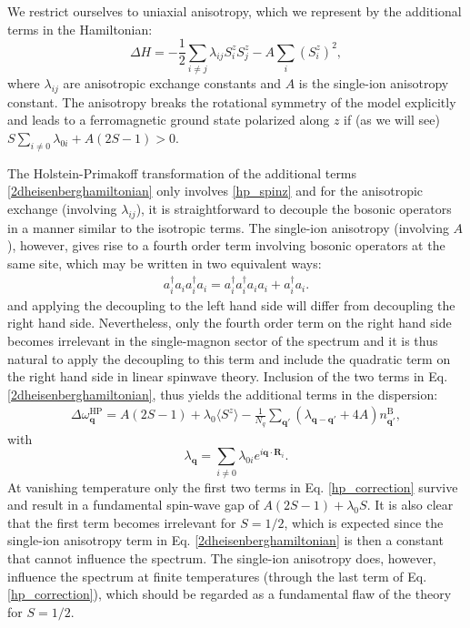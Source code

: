 \documentclass[aps,prb,reprint,floatfix,superscriptaddress]{revtex4-2}
\begin{document}
We restrict ourselves to uniaxial anisotropy, which we represent by the additional terms in the Hamiltonian:
\begin{equation}\label{2dheisenberghamiltonian}
    \Delta H = - \frac{1}{2} \sum_{i\neq j} \lambda_{ij} S_i^z S_j^z - A \sum_i ({S_i^z})^2,
\end{equation}
where $\lambda_{ij}$ are anisotropic exchange constants and $A$ is the single-ion anisotropy constant. The anisotropy breaks the rotational symmetry of the model explicitly and leads to a ferromagnetic ground state polarized along $z$ if (as we will see) $S\sum_{i\neq0}\lambda_{0i}+A(2S-1)>0$.


The Holstein-Primakoff transformation of the additional terms \eqref{2dheisenberghamiltonian} only involves \eqref{hp_spinz} and for the anisotropic exchange (involving $\lambda_{ij}$), it is straightforward to decouple the bosonic operators in a manner similar to the isotropic terms. The single-ion anisotropy (involving $A$), however, gives rise to a fourth order term involving bosonic operators at the same site, which may be written in two equivalent ways:
\begin{align}\label{sia-reorder}
   a_i^\dagger a_i a_i^\dagger a_i = a_i^\dagger a_i^\dagger a_i a_i + a_i^\dagger a_i.
\end{align}
and applying the decoupling to the left hand side will differ from decoupling the right hand side. 
Nevertheless, only the fourth order term on the right hand side becomes irrelevant in the single-magnon sector of the spectrum and it is thus natural to apply the decoupling to this term and include the quadratic term on the right hand side in linear spinwave theory. Inclusion of the two terms in Eq. \eqref{2dheisenberghamiltonian}, thus yields the additional terms in the dispersion:
\begin{align}\label{hp_correction}
    \Delta\omega^\mathrm{HP}_\mathbf{q} =A(2S-1)+\lambda_0\langle S^z\rangle-\frac{1}{N_q}\sum_{\mathbf{q}'}(\lambda_\mathbf{q-q'}+4A)n^\mathrm{B}_{\mathbf{q}'},
\end{align}
with
\begin{equation}\label{lambda-q-space}
   \lambda_\mathbf{q} = \sum_{i\neq0} \lambda_{0i} e^{i{\mathbf{q}} \cdot\mathbf{R}_i}.
\end{equation}
At vanishing temperature only the first two terms in Eq. \eqref{hp_correction} survive and result in a fundamental spin-wave gap of $A(2S-1)+\lambda_0S$. It is also clear that the first term becomes irrelevant for $S=1/2$, which is expected since the single-ion anisotropy term in Eq. \eqref{2dheisenberghamiltonian} is then a constant that cannot influence the spectrum. The single-ion anisotropy does, however, influence the spectrum at finite temperatures (through the last term of Eq. \eqref{hp_correction}), which should be regarded as a fundamental flaw of the theory for $S=1/2$.
\end{document}
